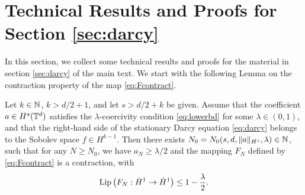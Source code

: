 \documentclass[reqno,a4paper]{amsart}
\begin{document}
\section{Technical Results and Proofs for Section \ref{sec:darcy}}
\label{app:s3a}
In this section, we collect some technical results and proofs for the material in section \ref{sec:darcy} of the main text. We start with the following Lemma on the contraction property of the map \eqref{eq:Fcontract}.
\begin{lemma} \label{lem:contract}
Let $k\in \mathbb{N}$, $k>d/2+1$, and let $s>d/2+k$ be given. Assume that the coefficient $a\in H^s(\mathbb{T}^d)$ satisfies the $\lambda$-coercivity condition \eqref{eq:lowerbd} for some $\lambda\in (0,1)$, and that the right-hand side of the stationary Darcy equation \eqref{eq:darcy} belongs to the Sobolev space $f\in H^{k-1}$. Then there exists $N_0 = N_0(s,d,\Vert a \Vert_{H^s}, \lambda) \in \mathbb{N}$, such that for any $N\ge N_0$, we have $a_N \ge \lambda/2$ and the mapping $F_N$ defined by \eqref{eq:Fcontract} is a contraction, with
\[
\mathrm{Lip}\left( F_N: \dot{H}^1 \to \dot{H}^1 \right) 
\le
1 - \frac{\lambda}{2}.
\]
\end{lemma}
\end{document}
